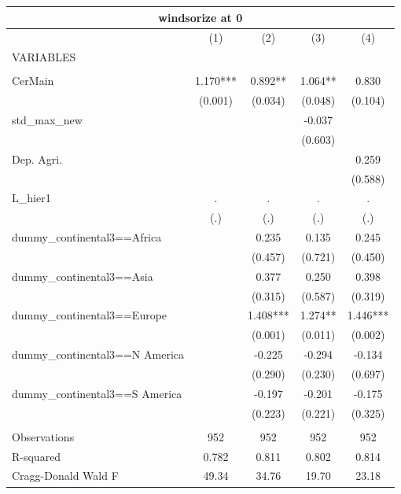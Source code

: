 \begin{tabular}{lcccc}
\multicolumn{5}{c}{windsorize at 0} \\ \hline
 & (1) & (2) & (3) & (4) \\
VARIABLES &  &  &  &  \\ \hline
 &  &  &  &  \\
CerMain & 1.170*** & 0.892** & 1.064** & 0.830 \\
 & (0.001) & (0.034) & (0.048) & (0.104) \\
std\_max\_new &  &  & -0.037 &  \\
 &  &  & (0.603) &  \\
Dep. Agri. &  &  &  & 0.259 \\
 &  &  &  & (0.588) \\
L\_hier1 & . & . & . & . \\
 & (.) & (.) & (.) & (.) \\
dummy\_continental3==Africa &  & 0.235 & 0.135 & 0.245 \\
 &  & (0.457) & (0.721) & (0.450) \\
dummy\_continental3==Asia &  & 0.377 & 0.250 & 0.398 \\
 &  & (0.315) & (0.587) & (0.319) \\
dummy\_continental3==Europe &  & 1.408*** & 1.274** & 1.446*** \\
 &  & (0.001) & (0.011) & (0.002) \\
dummy\_continental3==N America &  & -0.225 & -0.294 & -0.134 \\
 &  & (0.290) & (0.230) & (0.697) \\
dummy\_continental3==S America &  & -0.197 & -0.201 & -0.175 \\
 &  & (0.223) & (0.221) & (0.325) \\
 &  &  &  &  \\
Observations & 952 & 952 & 952 & 952 \\
R-squared & 0.782 & 0.811 & 0.802 & 0.814 \\
 Cragg-Donald Wald F & 49.34 & 34.76 & 19.70 & 23.18 \\ \hline
\end{tabular}
